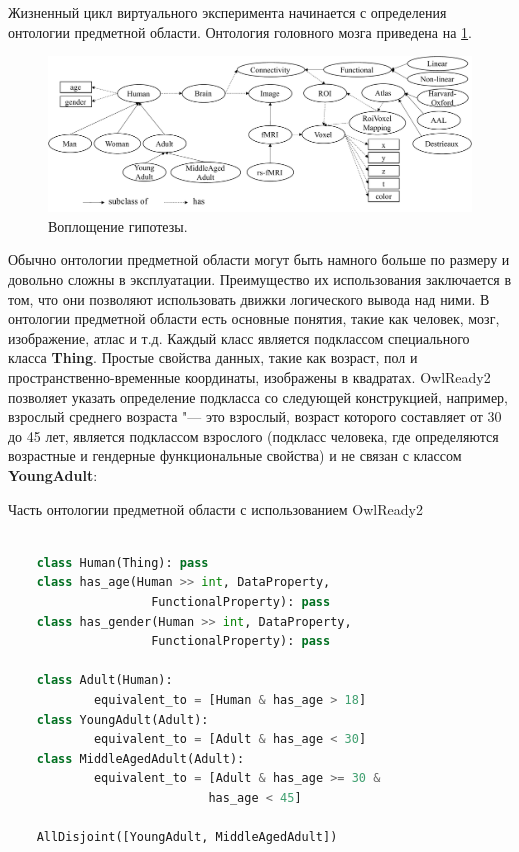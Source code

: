 Жизненный цикл виртуального эксперимента начинается с определения онтологии предметной области. 
Онтология головного мозга приведена на \cref{fig:DomainOnto}. 

\begin{figure}[ht]
    \centering
    \includegraphics[width=1.0\linewidth]{images/DomainOnto.pdf}
    \caption{Воплощение гипотезы.}\label{fig:DomainOnto}
\end{figure}

Обычно онтологии предметной области могут быть намного больше по размеру и довольно сложны в эксплуатации. 
Преимущество их использования заключается в том, что они позволяют использовать движки логического вывода над ними. 
В онтологии предметной области есть основные понятия, такие как человек, мозг, изображение, атлас и т.д. Каждый класс 
является подклассом специального класса \textbf{Thing}. Простые свойства данных, такие как возраст, пол и 
пространственно-временные координаты, изображены в квадратах. OwlReady2 позволяет указать определение подкласса 
со следующей конструкцией, например, взрослый среднего возраста "--- это взрослый, возраст которого составляет от 
30 до 45 лет, является подклассом взрослого (подкласс человека, где определяются возрастные и гендерные 
функциональные свойства) и не связан с классом \textbf{YoungAdult}:

\begin{ListingEnv}[!h]%
    \captiondelim{ } %
    \caption{Часть онтологии предметной области с использованием OwlReady2}\label{lst:ontology}
    \begin{lstlisting}[language={Python}]
    
    class Human(Thing): pass
    class has_age(Human >> int, DataProperty, 
                    FunctionalProperty): pass
    class has_gender(Human >> int, DataProperty, 
                    FunctionalProperty): pass

    class Adult(Human):
            equivalent_to = [Human & has_age > 18]
    class YoungAdult(Adult):
            equivalent_to = [Adult & has_age < 30]
    class MiddleAgedAdult(Adult):
            equivalent_to = [Adult & has_age >= 30 & 
                            has_age < 45]
                            
    AllDisjoint([YoungAdult, MiddleAgedAdult])
\end{lstlisting}
\end{ListingEnv}

